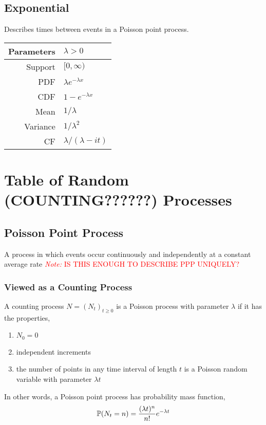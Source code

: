 \documentclass[12pt]{article}
\newcommand{\note}[1]{\textcolor{red}{\textit{Note:} #1}}
\begin{document}
\subsection{Exponential}
Describes times between events in a Poisson point process.
\begin{center}
\def\arraystretch{1.5}
\begin{tabular}{|r|l|} \hline
    Parameters & \( \lambda > 0 \) \\ \hline
    Support & \( [0,\infty) \) \\ \hline
    PDF & \( \lambda e^{-\lambda x} \) \\ \hline 
    CDF & \( 1-e^{- \lambda x} \) \\ \hline
    Mean & \( 1/\lambda \) \\ \hline
    Variance & \( 1/\lambda^2 \) \\ \hline
    CF & \( \lambda/(\lambda-it) \)\\ \hline
\end{tabular}
\end{center}


\pagebreak
\section{Table of Random (COUNTING??????) Processes}

\subsection{Poisson Point Process}
A process in which events occur continuously and independently at a constant average rate \note{IS THIS ENOUGH TO DESCRIBE PPP UNIQUELY?}

\subsubsection{Viewed as a Counting Process}
A counting process \( N = (N_t)_{t\geq 0} \) is a Poisson process with parameter \( \lambda \) if it has the properties,
\begin{enumerate}[nolistsep]
    \item \( N_0 = 0 \)
    \item independent increments
    \item the number of points in any time interval of length \( t \) is a Poisson random variable with parameter \( \lambda t \)
\end{enumerate}

In other words, a Poisson point process has probability mass function,
\begin{align*}
    \mathbb{P}(N_t=n) = \frac{(\lambda t)^n}{n!}e^{-\lambda t}
\end{align*}
\end{document}
